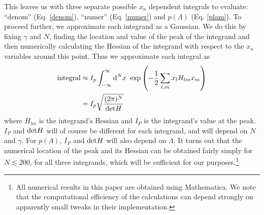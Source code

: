 \documentclass[12pt]{article}
\begin{document}
This leaves us with three separate possible $x_n$ dependent integrals  to evaluate: ``denom'' (Eq. \ref{denom}), ``numer'' (Eq. \ref{numer}) and $p(\Lambda)$ (Eq. \ref{plam}). To proceed further, we approximate each integrand as a Gaussian. We do this by fixing $\gamma$ and $N$, finding the location and value of the peak of the integrand and then numerically calculating the Hessian of the integrand with respect to the $x_n$ variables around this point. Thus we approximate each integral as
%
\begin{align}\label{Gauss}
\begin{split}
{\rm integral} &\approx I_p\int_{-\infty}^{\infty} {\rm d}^Nx\,\, \exp\left(-\frac{1}{2}\sum_{l,m}x_lH_{lm}x_m\right) \\
&=I_p \sqrt{\frac{(2\pi)^N}{\mathrm{det} H}}
\end{split}
\end{align}
%
\noindent where $H_{lm}$ is the integrand's Hessian and $I_P$ is the integrand's value at the peak. $I_P$ and ${\rm det}H$ will of course be different for each integrand, and will depend on $N$ and $\gamma$. For $p(\Lambda)$, $I_P$ and ${\rm det} H$ will also depend on $\Lambda$. It turns out that the numerical location of the peak and its Hessian can be obtained fairly simply for $N\lesssim 200$, for all three integrands, which will be sufficient for our purposes.\footnote{All numerical results in this paper are obtained using Mathematica. We note that the computational efficiency of the calculations can depend strongly on apparently small tweaks in their implementation.}
\end{document}
